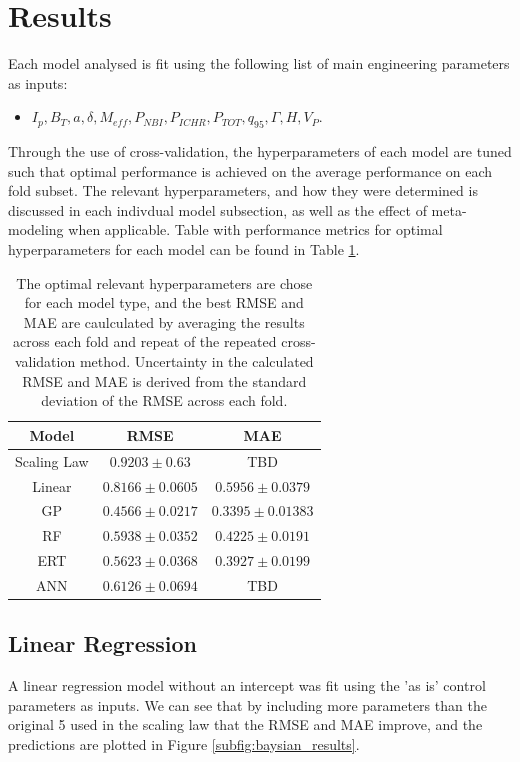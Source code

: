 \documentclass[a4paper, twoside, final, 12pt]{article}
\begin{document}
\section{Results}{\label{sec:results_1}
Each model analysed is fit using the following list of main engineering parameters as inputs:
\begin{itemize}
        \item $I_p, B_T, a, \delta, M_{eff}, P_{NBI}, P_{ICHR}, P_{TOT}, q_{95}, \Gamma, H, V_P$.
\end{itemize}
Through the use of cross-validation, the hyperparameters of each model are tuned such that optimal performance is achieved on the average performance on each fold subset.
The relevant hyperparameters, and how they were determined is discussed in each indivdual model subsection, as well as the effect of meta-modeling when applicable.
Table with performance metrics for optimal hyperparameters for each model can be found in Table \ref{tab:performance_models}.

\begin{table}
	\begin{center}
		\begin{tabular}{| c | c | c |}
		\hline
		Model & RMSE & MAE \\
		\hline
		Scaling Law & $0.9203 \pm 0.63$ & TBD \\
		\hline
		Linear & $0.8166 \pm 0.0605 $ & $0.5956 \pm 0.0379$ \\
		GP & $0.4566 \pm  0.0217$ &  $0.3395 \pm 0.01383$\\
		RF & $0.5938 \pm 0.0352$ & $0.4225 \pm 0.0191$ \\
		ERT &$0.5623 \pm 0.0368 $ & $0.3927 \pm 0.0199$ \\
		ANN & $0.6126 \pm 0.0694$ & TBD \\
		\hline
		\end{tabular}
		\caption{The optimal relevant hyperparameters are chose for each model type, and the best RMSE and MAE are caulculated by averaging the results across each fold and repeat of the repeated cross-validation method. Uncertainty in the calculated RMSE and MAE is derived from the  standard deviation of the RMSE across each fold.}
		\label{tab:performance_models}
	\end{center}
\end{table}

\subsection{Linear Regression}
A linear regression model without an intercept was fit using the 'as is' control parameters as inputs.
We can see that by including more parameters than the original 5 used in the scaling law that the RMSE and MAE improve, and the predictions are plotted in Figure \ref{subfig:baysian_results}.

}
\end{document}
